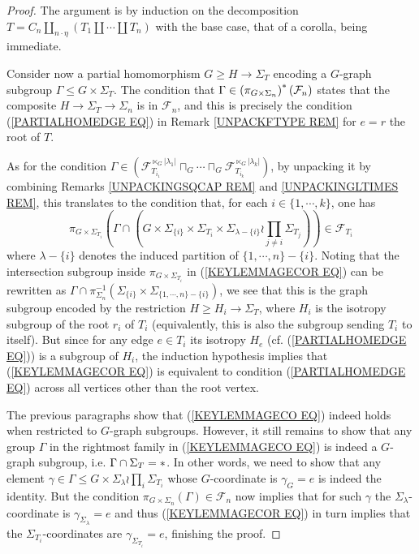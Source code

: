 \documentclass[a4paper,10pt]{article}%
\begin{document}
\begin{proof} The argument is by induction on the decomposition
$T= C_n \amalg_{n \cdot \eta}(T_1 \amalg \cdots \amalg T_n)$
with the base case, that of a corolla, being immediate.

	Consider now a partial homomorphism $G \geq H \to \Sigma_T$ encoding a 
	$G$-graph subgroup $\Gamma \leq G \times \Sigma_T$.
	The condition that $\Gamma \in \left(\pi_{G \times \Sigma_n}\right)^{\**}(\mathcal{F}_n)$ states that the composite $H \to \Sigma_T \to \Sigma_n$ is in $\mathcal{F}_n$, 
	and this is precisely the condition (\ref{PARTIALHOMEDGE EQ}) in Remark \ref{UNPACKFTYPE REM}
	for $e=r$ the root of $T$.

As for the condition 
	$ \Gamma \in 
	\left(
	\mathcal{F}_{T_{i_1}}^{\ltimes_G |\lambda_1|}
		\sqcap_G \cdots \sqcap_G
	\mathcal{F}_{T_{i_k}}^{\ltimes_G |\lambda_k|}
	\right)	$, by unpacking it by combining 
	Remarks \ref{UNPACKINGSQCAP REM} and 
	\ref{UNPACKINGLTIMES REM},
	this translates to the condition that, for each $i \in \{1,\cdots,k\}$, one has
	\begin{equation}\label{KEYLEMMAGECOR EQ}
	\pi_{G \times \Sigma_{T_i}}
	\left(
		\Gamma \cap 
	\left(
		G \times \Sigma_{\{i\}} \times \Sigma_{T_i}
		\times 
		\Sigma_{\lambda-\{i\}} \wr \prod_{j\neq i} \Sigma_{T_j}
	\right)
	\right)	
	\in \mathcal{F}_{T_i}
	\end{equation}
where $\lambda - \{i\}$ denotes the induced partition of 
$\{1,\cdots,n\} - \{i\}$. Noting that the intersection subgroup  inside $\pi_{G \times \Sigma_{T_i}}$ in (\ref{KEYLEMMAGECOR EQ}) can be rewritten as 
$\Gamma \cap \pi_{\Sigma_n}^{-1}
(\Sigma_{\{i\}} \times \Sigma_{\{1,\cdots,n\} - \{i\}})$,
we see that this is the graph subgroup encoded by the restriction $H \geq H_i \to \Sigma_T$, where $H_i$ is the isotropy subgroup of the root $r_i$ of $T_i$ (equivalently, this is also the subgroup sending $T_i$ to itself).
But since for any edge $e \in T_i$ its isotropy $H_e$ 
(cf. (\ref{PARTIALHOMEDGE EQ})) is a subgroup of $H_i$, the induction hypothesis implies that (\ref{KEYLEMMAGECOR EQ})
is equivalent to condition (\ref{PARTIALHOMEDGE EQ}) 
across all vertices other than the root vertex.

The previous paragraphs show that 
(\ref{KEYLEMMAGECO EQ})
indeed holds when restricted to $G$-graph subgroups. However, it still remains to show that any group $\Gamma$ in the rightmost family in (\ref{KEYLEMMAGECO EQ}) is indeed
a $G$-graph subgroup, i.e. $\Gamma \cap \Sigma_T =\**$.
In other words, we need to show that any element 
$\gamma \in \Gamma \leq
G \times \Sigma_{\lambda} \wr \prod_{i} \Sigma_{T_i}$
whose $G$-coordinate is 
$\gamma_G = e$ is indeed the identity.
But the condition 
$\pi_{G \times \Sigma_n}(\Gamma) \in \mathcal{F}_n$ now implies that for such $\gamma$ the $\Sigma_{\lambda}$-coordinate is $\gamma_{\Sigma_{\lambda}} = e$
and thus (\ref{KEYLEMMAGECOR EQ}) in turn implies that the 
$\Sigma_{T_i}$-coordinates are 
$\gamma_{\Sigma_{T_i}} = e$,
finishing the proof.
\end{proof}
\end{document}
